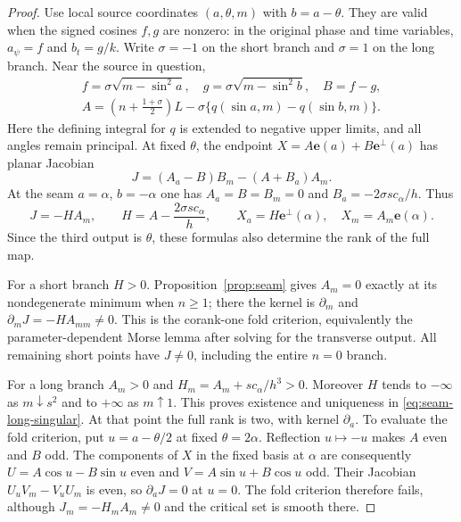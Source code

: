 \documentclass[11pt,a4paper]{article}
\theoremstyle{remark}\newtheorem{remark}[theorem]{Remark}
\newcommand{\ee}{\mathbf e}
\begin{document}
\begin{proof}
Use local source coordinates $(a,\theta,m)$ with $b=a-\theta$.
They are valid when the signed cosines $f,g$ are nonzero: in the
original phase and time variables, $a_\psi=f$ and $b_t=g/k$.
Write $\sigma=-1$ on the short branch and $\sigma=1$ on the long
branch. Near the source in question,
\[
 \begin{gathered}
 f=\sigma\sqrt{m-\sin^2a},\quad
 g=\sigma\sqrt{m-\sin^2b},\quad B=f-g,\\
 A=\left(n+\frac{1+\sigma}{2}\right)L
       -\sigma\{q(\sin a,m)-q(\sin b,m)\}.
 \end{gathered}
\]
Here the defining integral for $q$ is extended to negative upper
limits, and all angles remain principal. At fixed $\theta$, the
endpoint $X=A\ee(a)+B\ee^\perp(a)$ has planar Jacobian
\[
 J=(A_a-B)B_m-(A+B_a)A_m.
\]
At the seam $a=\alpha$, $b=-\alpha$ one has
$A_a=B=B_m=0$ and $B_a=-2\sigma sc_\alpha/h$. Thus
\begin{equation}\label{eq:seam-full-jacobian}
 J=-H A_m,\qquad H=A-\frac{2\sigma sc_\alpha}{h},
 \qquad X_a=H\ee^\perp(\alpha),\quad X_m=A_m\ee(\alpha).
\end{equation}
Since the third output is $\theta$, these formulas also determine
the rank of the full map.

For a short branch $H>0$. Proposition~\ref{prop:seam} gives
$A_m=0$ exactly at its nondegenerate minimum when $n\ge1$;
there the kernel is $\partial_m$ and
$\partial_mJ=-H A_{mm}\ne0$. This is the corank-one fold
criterion, equivalently the parameter-dependent Morse lemma after
solving for the transverse output. All remaining short points have
$J\ne0$, including the entire $n=0$ branch.

For a long branch $A_m>0$ and
$H_m=A_m+sc_\alpha/h^3>0$. Moreover $H$ tends to $-\infty$
as $m\downarrow s^2$ and to $+\infty$ as $m\uparrow1$.
This proves existence and uniqueness in
\eqref{eq:seam-long-singular}. At that point the full rank is two,
with kernel $\partial_a$. To evaluate the fold criterion, put
$u=a-\theta/2$ at fixed $\theta=2\alpha$. Reflection $u\mapsto-u$
makes $A$ even and $B$ odd. The components of $X$ in the fixed
basis at $\alpha$ are consequently
$U=A\cos u-B\sin u$ even and $V=A\sin u+B\cos u$ odd.
Their Jacobian $U_uV_m-V_uU_m$ is even, so $\partial_aJ=0$
at $u=0$. The fold criterion therefore fails, although
$J_m=-H_mA_m\ne0$ and the critical set is smooth there.
\end{proof}
\end{document}
